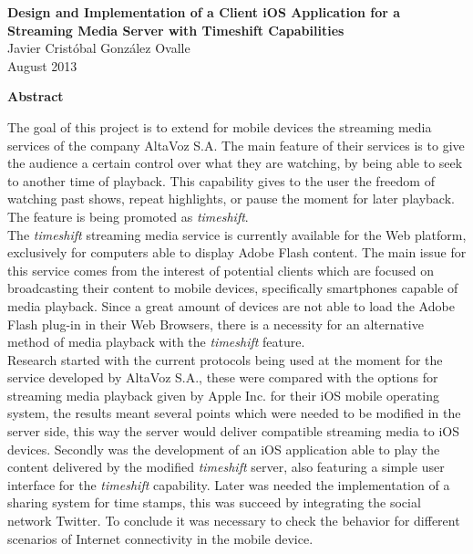 \newpage
\begin{center}
 \Large \textbf{Design and Implementation of a Client iOS Application for a Streaming Media Server with Timeshift Capabilities}\\
  

\normalsize Javier Cristóbal González Ovalle \\
\normalsize August 2013

\Large \textbf{Abstract}

\end{center}
\normalsize

The goal of this project is to extend for mobile devices the streaming media services of the company AltaVoz S.A. The main feature of their services is to give the audience a certain control over what they are watching, by being able to seek to another time of playback. This capability gives to the user the freedom of watching past shows, repeat highlights, or pause the moment for later playback. The feature is being promoted as \textit{timeshift}.\\



The \textit{timeshift} streaming media service is currently available for the Web platform, exclusively for computers able to display Adobe Flash content. The main issue for this service comes from the interest of potential clients which are focused on broadcasting their content to mobile devices, specifically smartphones capable of media playback. Since a great amount of devices are not able to load the Adobe Flash plug-in in their Web Browsers, there is a necessity for an alternative method of media playback with the \textit{timeshift} feature.\\

 


Research started with the current protocols being used at the moment for the service developed by AltaVoz S.A., these were compared with the options for streaming media playback given by Apple Inc. for their iOS mobile operating system, the results meant several points which were needed to be modified in the server side, this way the server would deliver compatible streaming media to iOS devices. Secondly was the development of an iOS application able to play the content delivered by the modified \textit{timeshift} server, also featuring a simple user interface for the \textit{timeshift} capability.
Later was needed the implementation of a sharing system for time stamps, this was succeed by integrating the social network Twitter. To conclude it was necessary to check the behavior for different scenarios of Internet connectivity in the mobile device. 
\\

